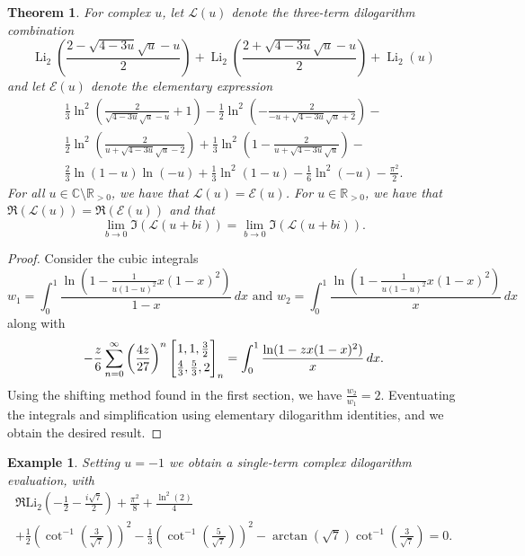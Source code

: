 \documentclass[12pt]{article}
\newtheorem{theorem}{Theorem}
\newtheorem{example}{Example}
\begin{document}
\begin{theorem}\label{generalforCampbell}
 For complex $u$, let $\mathcal{L}(u)$ denote the three-term dilogarithm combination $$ \operatorname{Li}_{2}\left( \frac{ 2-\sqrt{4 - 
 3 u} \sqrt{u}-u }{2} \right) + \operatorname{Li}_{2}\left( \frac{2+\sqrt{4-3 u} \sqrt{u}-u}{2} \right) + 
 \operatorname{Li}_{2}(u) $$ and let $\mathcal{E}(u)$ denote the elementary expression 
\begin{multline*}
 \frac{1}{3} \ln^2\left(\frac{2}{\sqrt{4-3 u} \sqrt{u}-u} + 1\right) -\frac{1}{2} \ln ^2\left(-\frac{2}{-u+\sqrt{4-3 u} 
 \sqrt{u}+2}\right) - \\ 
 \frac{1}{2} \ln ^2\left(\frac{2}{u+\sqrt{4-3 u} \sqrt{u}-2}\right)+\frac{1}{3} \ln
 ^2\left(1-\frac{2}{u+\sqrt{4-3 u} \sqrt{u}}\right) - \\ 
 \frac{2}{3} \ln (1-u) \ln (-u) 
 + \frac{1}{3} \ln ^2(1-u) - \frac{1}{6} \ln ^2(-u) -\frac{\pi ^2}{2}. 
\end{multline*}
 For all $u \in \mathbb{C} \setminus \mathbb{R}_{>0}$, we have that 
 $\mathcal{L}(u) = \mathcal{E}(u)$. For $u \in \mathbb{R}_{>0}$, 
 we have that $\Re\left(\mathcal{L}(u) \right) = \Re\left( \mathcal{E}(u) \right)$
 and that 
 $$ \lim_{b \to 0} \Im\left(\mathcal{L}(u + bi) \right) = \lim_{b \to 0} \Im\left(\mathcal{L}(u + bi) \right). $$
\end{theorem}

\begin{proof}
 Consider the cubic integrals 
\begin{equation}\label{w1w2forCampbell}
w_1 = \int_{0}^{1} \frac{\ln\left(1 - \frac{1}{u(1-u)^2} x(1-x)^2\right)}{1-x} \, dx \text{ and } w_2 = \int_{0}^{1} \frac{\ln\left(1 - \frac{1}{u(1-u)^2} x(1-x)^2\right)}{x} \, dx 
\end{equation}
 along with 
\[ -\frac{z}{6} \sum_{n=0}^{\infty} \left( \frac{4z}{27} \right)^n 
 \left[ \begin{matrix} 
 1, 1, \frac{3}{2} 
 \vspace{1mm} \\ 
 \frac{4}{3}, \frac{5}{3}, 2 \end{matrix} \right]_{n} = 
 \int_0^1 \frac{\ln(1 - z x (1 - x)^2)}{x} \, dx. 
\]
  Using the shifting method found in the first section, we have $\frac{w_2}{w_1}=2$. Eventuating the integrals and  simplification using 
 elementary dilogarithm identities, and we obtain the desired result. 
\end{proof}

\begin{example}
 Setting $u=-1$ 
 we obtain a single-term complex dilogarithm evaluation, with 
\begin{multline*}
 \Re\mathrm{Li}_2\left(-\frac{1}{2} - \frac{i\sqrt{7}}{2}\right) 
 + \frac{\pi^2}{8} 
 + \frac{\ln^2(2)}{4} \\
 + \frac{1}{2} \left(\cot^{-1}\left(\frac{3}{\sqrt{7}}\right)\right)^2 
 - \frac{1}{3} \left(\cot^{-1}\left(\frac{5}{\sqrt{7}}\right)\right)^2 
 - \operatorname{arctan}(\sqrt{7}) \cot^{-1}\left(\frac{3}{\sqrt{7}}\right)=0. 
\end{multline*}
\end{example}
\end{document}
